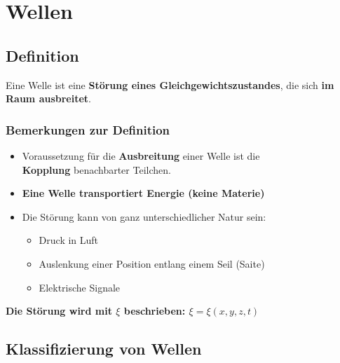 \section{Wellen}

\subsection{Definition}

Eine Welle ist eine \textbf{Störung eines Gleichgewichtszustandes}, die sich \textbf{im Raum ausbreitet}.


\subsubsection{Bemerkungen zur Definition}

\begin{itemize}
	\itemsep0em
	\item Voraussetzung für die \textbf{Ausbreitung} einer Welle ist die \\
		\textbf{Kopplung} benachbarter Teilchen.	
	\item \textbf{Eine Welle transportiert Energie (keine Materie)} 
	\item Die Störung kann von ganz unterschiedlicher Natur sein: 
		\begin{itemize}
			\item Druck in Luft
			\item Auslenkung einer Position entlang einem Seil (Saite)
			\item Elektrische Signale  
		\end{itemize}
\end{itemize}


\textbf{Die Störung wird mit $\xi$ beschrieben: $\xi = \xi(x, y, z, t)$}



\subsection{Klassifizierung von Wellen}

